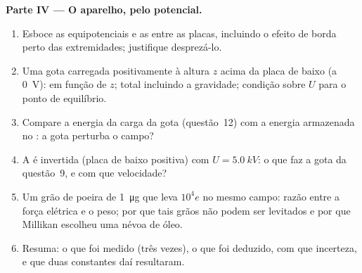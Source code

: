 \begin{problem}
\medskip
\noindent\textbf{Parte IV --- O aparelho, pelo potencial.}
\begin{enumerate}[resume]
  \item Esboce as equipotenciais e as  entre as placas,
        incluindo o efeito de borda perto das extremidades; justifique desprezá-lo.
  \item Uma gota carregada positivamente à altura $z$ acima da placa de baixo
        (a \qty{0}{V}):  em função de $z$;  total incluindo a gravidade; condição sobre $U$ para o
        ponto de equilíbrio.
  \item Compare a energia da carga da gota (questão~12) com a
        energia armazenada no : a gota perturba o campo?
  \item A  é invertida (placa de baixo positiva) com
        $U = \qty{5.0}{kV}$: o que faz a gota da questão~9, e com
        que velocidade?
  \item Um grão de poeira de \qty{1}{\micro g} que leva $10^4e$ no mesmo
        campo: razão entre a força elétrica e o peso; por que tais grãos não podem
        ser levitados e por que Millikan escolheu uma névoa de óleo.
  \item Resuma: o que foi medido (três vezes), o que foi deduzido,
        com que incerteza, e que duas constantes daí resultaram.
\end{enumerate}
\end{problem}
